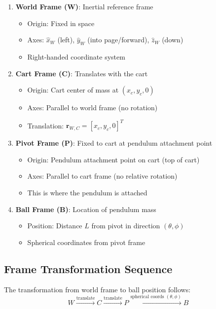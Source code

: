 \documentclass[12pt]{article}
\begin{document}
\begin{enumerate}
    \item \textbf{World Frame (W)}: Inertial reference frame
    \begin{itemize}
        \item Origin: Fixed in space
        \item Axes: $\hat{x}_W$ (left), $\hat{y}_W$ (into page/forward), $\hat{z}_W$ (down)
        \item Right-handed coordinate system
    \end{itemize}
    
    \item \textbf{Cart Frame (C)}: Translates with the cart
    \begin{itemize}
        \item Origin: Cart center of mass at $(x_c, y_c, 0)$
        \item Axes: Parallel to world frame (no rotation)
        \item Translation: $\mathbf{r}_{W,C} = [x_c, y_c, 0]^T$
    \end{itemize}
    
    \item \textbf{Pivot Frame (P)}: Fixed to cart at pendulum attachment point
    \begin{itemize}
        \item Origin: Pendulum attachment point on cart (top of cart)
        \item Axes: Parallel to cart frame (no relative rotation)
        \item This is where the pendulum is attached
    \end{itemize}
    
    \item \textbf{Ball Frame (B)}: Location of pendulum mass
    \begin{itemize}
        \item Position: Distance $L$ from pivot in direction $(\theta, \phi)$
        \item Spherical coordinates from pivot frame
    \end{itemize}
\end{enumerate}

\subsection{Frame Transformation Sequence}

The transformation from world frame to ball position follows:
\begin{equation}
    W \xrightarrow{\text{translate}} C \xrightarrow{\text{translate}} P \xrightarrow{\text{spherical coords } (\theta, \phi)} B
\end{equation}
\end{document}
